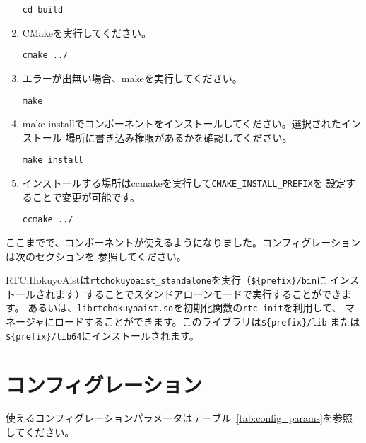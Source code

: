 \documentclass[a4paper,10pt]{article}
\newenvironment{Japanese}{%
  \CJKfamily{min}%
  \CJKtilde
  \CJKnospace}{}
\begin{document}
\begin{CJK}{UTF8}{}
\begin{Japanese}
\begin{enumerate}
  \verb|cd build|
  \item CMakeを実行してください。

  \verb|cmake ../|
  \item エラーが出無い場合、makeを実行してください。

  \verb|make|
  \item make
  installでコンポーネントをインストールしてください。選択されたインストール
  場所に書き込み権限があるかを確認してください。

  \verb|make install|
  \item
  インストールする場所はccmakeを実行して\verb|CMAKE_INSTALL_PREFIX|を
  設定することで変更が可能です。

  \verb|ccmake ../|
\end{enumerate}

ここまでで、コンポーネントが使えるようになりました。コンフィグレーションは次のセクションを
参照してください。

RTC:HokuyoAistは\verb|rtchokuyoaist_standalone|を実行（\verb|${prefix}/bin|に
インストールされます）することでスタンドアローンモードで実行することができます。
あるいは、\verb|librtchokuyoaist.so|を初期化関数の\verb|rtc_init|を利用して、
マネージャにロードすることができます。このライブラリは\verb|${prefix}/lib|
または\verb|${prefix}/lib64|にインストールされます。

\section{コンフィグレーション}
\label{sec:configuration}

使えるコンフィグレーションパラメータはテーブル~\ref{tab:config_params}を参照
してください。


\end{Japanese}
\end{CJK}
\end{document}
